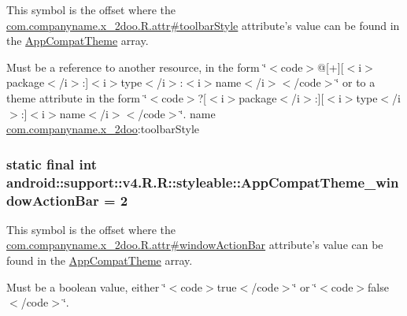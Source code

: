 This symbol is the offset where the \hyperlink{classcom_1_1companyname_1_1x__2doo_1_1_r_1_1attr_d37e97fa29025fc2ba46df7d6e0a01ec}{com.companyname.x\_\-2doo.R.attr\#toolbarStyle} attribute's value can be found in the \hyperlink{classandroid_1_1support_1_1v4_1_1_r_1_1styleable_0873e92ba21076bb5a4aeadeb7f5779f}{AppCompatTheme} array.

Must be a reference to another resource, in the form \char`\"{}$<$code$>$@\mbox{[}+\mbox{]}\mbox{[}$<$i$>$package$<$/i$>$:\mbox{]}$<$i$>$type$<$/i$>$:$<$i$>$name$<$/i$>$$<$/code$>$\char`\"{} or to a theme attribute in the form \char`\"{}$<$code$>$?\mbox{[}$<$i$>$package$<$/i$>$:\mbox{]}\mbox{[}$<$i$>$type$<$/i$>$:\mbox{]}$<$i$>$name$<$/i$>$$<$/code$>$\char`\"{}.  name \hyperlink{namespacecom_1_1companyname_1_1x__2doo}{com.companyname.x\_\-2doo}:toolbarStyle \hypertarget{classandroid_1_1support_1_1v4_1_1_r_1_1styleable_8831994a0d23fc63a5a2b0ebf86c8780}{
\subsubsection[{AppCompatTheme\_\-windowActionBar}]{\setlength{\rightskip}{0pt plus 5cm}static final int android::support::v4.R.R::styleable::AppCompatTheme\_\-windowActionBar = 2}}
\label{classandroid_1_1support_1_1v4_1_1_r_1_1styleable_8831994a0d23fc63a5a2b0ebf86c8780}


This symbol is the offset where the \hyperlink{classcom_1_1companyname_1_1x__2doo_1_1_r_1_1attr_30166d5608d3fa87b3f864f4f5048c55}{com.companyname.x\_\-2doo.R.attr\#windowActionBar} attribute's value can be found in the \hyperlink{classandroid_1_1support_1_1v4_1_1_r_1_1styleable_0873e92ba21076bb5a4aeadeb7f5779f}{AppCompatTheme} array.

Must be a boolean value, either \char`\"{}$<$code$>$true$<$/code$>$\char`\"{} or \char`\"{}$<$code$>$false$<$/code$>$\char`\"{}. 

